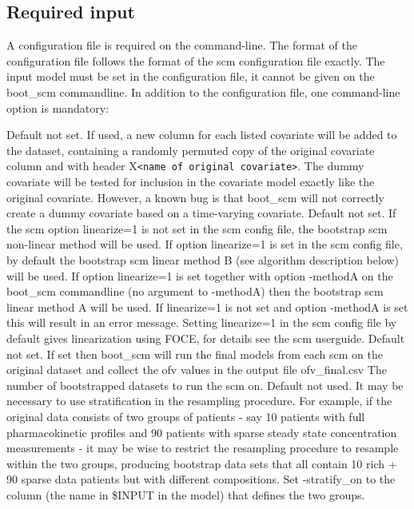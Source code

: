 \subsection{Required input}
A configuration file is required on the command-line. The format of the configuration file follows the format of the scm configuration file exactly. 
The input model must be set in the configuration file, it cannot be given on the boot\_scm commandline. 
In addition to the configuration file, one command-line option is mandatory:
\begin{optionlist}
Default not set. If used, a new column for each listed covariate will be added to the dataset, 														  
containing a randomly permuted copy of the original covariate column and with header X\verb|<name of original covariate>|. 
The dummy covariate will be tested for inclusion in the covariate model exactly like the original covariate. 
However, a known bug is that boot\_scm will not correctly create a 
dummy covariate based on a time-varying covariate.
\nextopt
{}
Default not set. If the scm option linearize=1 is not set in the scm config file, 
the bootstrap scm non-linear method will be used. If option linearize=1 is set in the scm config file, 
by default the bootstrap scm linear method B (see algorithm description below) will be used. 
If option linearize=1 is set  together with option -methodA on the boot\_scm commandline (no argument to -methodA) 
then the bootstrap scm linear method A will be used. If linearize=1 
is not set and option -methodA is set this will result in an error message.  
Setting linearize=1 in the scm config file by default gives linearization using FOCE, for details see the
scm userguide.
\nextopt
{}
Default not set. If set then boot\_scm will run the final models from each scm on the original dataset and collect the ofv values 
in the output file ofv\_final.csv   
\nextopt
{}
The number of bootstrapped datasets to run the scm on. 
\nextopt
{}
Default not used. It may be necessary to use stratification in the resampling procedure. For example, if the original data consists of two groups 
of patients - say 10 patients with full pharmacokinetic profiles and 90 patients with sparse steady state concentration measurements - it may be 
wise to restrict the resampling procedure to resample within the two groups, producing bootstrap data sets that all contain 10 rich + 90 sparse 
data patients but with different compositions. 
Set -stratify\_on to the column (the name in \$INPUT in the model) that defines the two groups.
\nextopt
\end{optionlist}

